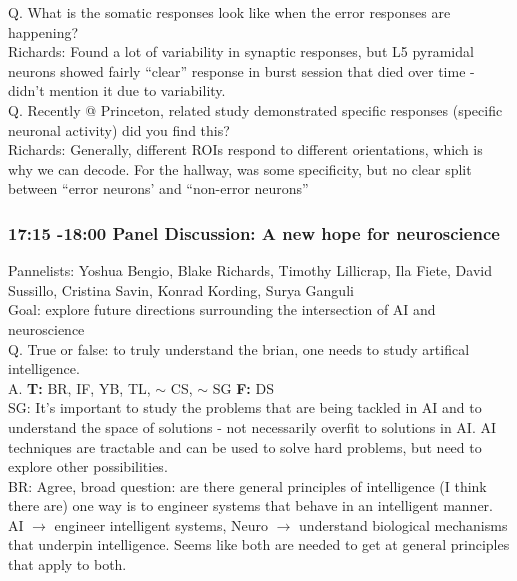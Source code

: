 \documentclass[12pt]{article}
\begin{document}
Q. What is the somatic responses look like when the error responses are happening? \\

Richards: Found a lot of variability in synaptic responses, but L5 pyramidal neurons showed fairly ``clear'' response in burst session that died over time - didn't mention it due to variability. \\

Q. Recently @ Princeton, related study demonstrated specific responses (specific neuronal activity) did you find this? \\

Richards: Generally, different ROIs respond to different orientations, which is why we can decode. For the hallway, was some specificity, but no clear split between ``error neurons' and ``non-error neurons'' \\


\subsubsection{17:15 -18:00 Panel Discussion: A new hope for neuroscience}

Pannelists: Yoshua Bengio, Blake Richards, Timothy Lillicrap,  Ila Fiete, David Sussillo, Cristina Savin, Konrad Kording, Surya Ganguli \\

Goal: explore future directions surrounding the intersection of AI and neuroscience \\

Q. True or false: to truly understand the brian, one needs to study artifical intelligence.  \\

A. \textbf{T: } BR, IF, YB, TL, $\sim$ CS, $\sim$ SG \textbf{F: }DS \\

SG: It's important to study the problems that are being tackled in AI and to understand the space of solutions - not necessarily overfit to solutions in AI. AI techniques are tractable and can be used to solve hard problems, but need to explore other possibilities. \\

BR: Agree, broad question: are there general principles of intelligence (I think there are) one way is to engineer systems that behave in an intelligent manner. AI $\rightarrow$ engineer intelligent systems, Neuro $\rightarrow$ understand biological mechanisms that underpin intelligence. Seems like both are needed to get at general principles that apply to both. \\
\end{document}
